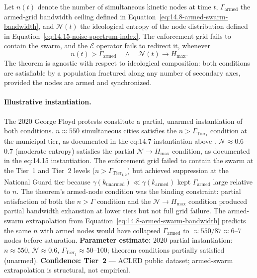 \begin{definition}\label{def:botnet_load}
Let $n(t)$ denote the number of simultaneous kinetic nodes at time $t$, $\Gamma_{\text{armed}}$ the armed-grid bandwidth ceiling defined in Equation~\eqref{eq:14.8-armed-swarm-bandwidth}, and $\mathcal{N}(t)$ the ideological entropy of the node distribution defined in Equation~\eqref{eq:14.15-noise-spectrum-index}. The enforcement grid fails to contain the swarm, and the $\mathcal{E}$ operator fails to redirect it, whenever
\begin{equation}\label{eq:14.17-botnet-load-theorem}
n(t) > \Gamma_{\text{armed}} \quad \wedge \quad \mathcal{N}(t) \to H_{\max}.
\end{equation}
The theorem is agnostic with respect to ideological composition: both conditions are satisfiable by a population fractured along any number of secondary axes, provided the nodes are armed and synchronized.

\paragraph{Illustrative instantiation.}
The 2020 George Floyd protests constitute a partial, unarmed instantiation of both conditions. $n \approx 550$ simultaneous cities satisfies the $n > \Gamma_{\text{Tier}_1}$ condition at the municipal tier, as documented in the eq:14.7 instantiation above \cite{acled_us_2020}. $\mathcal{N} \approx 0.6$--0.7 (moderate entropy) satisfies the partial $\mathcal{N} \to H_{\max}$ condition, as documented in the eq:14.15 instantiation. The enforcement grid failed to contain the swarm at the Tier~1 and Tier~2 levels ($n > \Gamma_{\text{Tier}_{1,2}}$) but achieved suppression at the National Guard tier because $\gamma(k_{\text{unarmed}}) \ll \gamma(k_{\text{armed}})$ kept $\Gamma_{\text{armed}}$ large relative to $n$. The theorem's armed-node condition was the binding constraint: partial satisfaction of both the $n > \Gamma$ condition and the $\mathcal{N} \to H_{\max}$ condition produced partial bandwidth exhaustion at lower tiers but not full grid failure. The armed-swarm extrapolation from Equation~\eqref{eq:14.8-armed-swarm-bandwidth} predicts the same $n$ with armed nodes would have collapsed $\Gamma_{\text{armed}}$ to $\approx 550/87 \approx 6$--7 nodes before saturation. \textbf{Parameter estimate:} 2020 partial instantiation: $n \approx 550$, $\mathcal{N} \approx 0.6$, $\Gamma_{\text{Tier}_1} \approx 50$--100; theorem conditions partially satisfied (unarmed). \textbf{Confidence: Tier~2} --- ACLED public dataset; armed-swarm extrapolation is structural, not empirical.
\end{definition}

